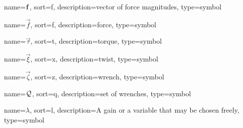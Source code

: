 	{%
		name=\ensuremath{\mat{f}},
		sort=f,
		description=vector of force magnitudes,
		type=symbol
	}
	\newcommand{\forcemagvec}{\gls{sym:forcemagvec}}

	{%
		name=\ensuremath{\vec{f}},
		sort=f,
		description=force,
		type=symbol
	}
	\newcommand{\force}{\gls{sym:force}}

	{%
		name=\ensuremath{\vec{\tau}},
		sort=t,
		description=torque,
		type=symbol
	}
	\newcommand{\torque}{\gls{sym:torque}}

	{%
		name=\ensuremath{\vec{\xi}},
		sort=x,
		description=twist,
		type=symbol
	}
	\newcommand{\twist}{\gls{sym:twist}}

	{%
		name=\ensuremath{\vec{\zeta}},
		sort=z,
		description=wrench,
		type=symbol
	}
	\newcommand{\wrench}{\gls{sym:wrench}}

	{%
		name=\ensuremath{\set{Q}},
		sort=q,
		description=set of wrenches,
		type=symbol
	}
	\newcommand{\setofwrenches}{\gls{sym:setofwrenches}}

	{%
		name={\ensuremath{\lambda}},
		sort=l,
		description=A gain or a variable that may be chosen freely,
		type=symbol
	}
	\newcommand{\gain}{\gls{sym:gain}}

